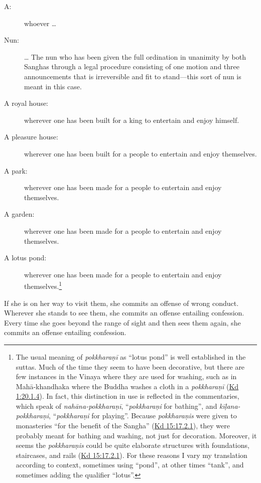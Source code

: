 \documentclass[12pt,openany]{book}%
\begin{document}
\begin{description}%
\item[A: ] whoever … %
\item[Nun: ] … The nun who has been given the full ordination in unanimity by both Sanghas through a legal procedure consisting of one motion and three announcements that is irreversible and fit to stand—this sort of nun is meant in this case. %
\item[A royal house: ] wherever one has been built for a king to entertain and enjoy himself. %
\item[A pleasure house: ] wherever one has been built for a people to entertain and enjoy themselves. %
\item[A park: ] wherever one has been made for a people to entertain and enjoy themselves. %
\item[A garden: ] wherever one has been made for a people to entertain and enjoy themselves. %
\item[A lotus pond: ] wherever one has been made for a people to entertain and enjoy themselves.\footnote{The usual meaning of \textit{\textsanskrit{pokkharaṇī}} as “lotus pond” is well established in the suttas. Much of the time they seem to have been decorative, but there are few instances in the Vinaya where they are used for washing, such as in \textsanskrit{Mahā}-khandhaka where the Buddha washes a cloth in a \textit{\textsanskrit{pokkharaṇī}} (\href{https://suttacentral.net/pli-tv-kd1/en/brahmali\#20.1.4}{Kd 1:20.1.4}). In fact, this distinction in use is reflected in the commentaries, which speak of \textit{\textsanskrit{nahāna}-\textsanskrit{pokkharaṇī}}, “\textit{\textsanskrit{pokkharaṇi}} for bathing”, and \textit{\textsanskrit{kīḷana}-\textsanskrit{pokkharaṇi}}, “\textit{\textsanskrit{pokkharaṇi}} for playing”. Because \textit{\textsanskrit{pokkharaṇis}} were given to monasteries “for the benefit of the Sangha” (\href{https://suttacentral.net/pli-tv-kd15/en/brahmali\#17.2.1}{Kd 15:17.2.1}), they were probably meant for bathing and washing, not just for decoration. Moreover, it seems the \textit{\textsanskrit{pokkharaṇis}} could be quite elaborate structures with foundations, staircases, and rails (\href{https://suttacentral.net/pli-tv-kd15/en/brahmali\#17.2.6}{Kd 15:17.2.1}). For these reasons I vary my translation according to context, sometimes using “pond”, at other times “tank”, and sometimes adding the qualifier “lotus”. } %
\end{description}

If she is on her way to visit them, she commits an offense of wrong conduct. Wherever she stands to see them, she commits an offense entailing confession. Every time she goes beyond the range of sight and then sees them again, she commits an offense entailing confession. 
\end{document}
